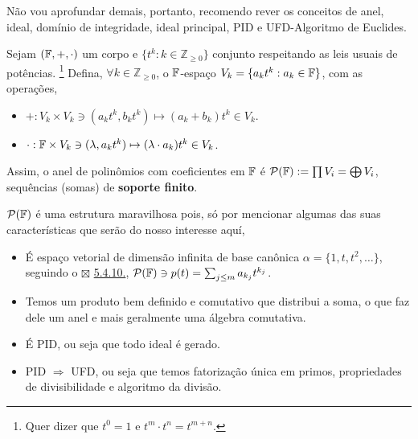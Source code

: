 Não vou aprofundar demais, portanto, recomendo rever os conceitos de anel, ideal, domínio de integridade, ideal principal, PID e UFD-Algoritmo de Euclides. 
\begin{definition}
    Sejam \((\mathbb{F},+,\cdot)\) um corpo e \(\{t^k: k \in \mathbb{Z}_{\geq 0}\}\) conjunto respeitando as leis usuais de potências. \footnote{Quer dizer que \(t^0 =1\) e \(t^m\cdot t^n=t^{m+n}\).  } Defina, \(\forall k \in \mathbb{Z}_{\geq 0}\), o \(\mathbb{F}\)-espaço \(V_k = \{a_kt^k: a_k \in \mathbb{F}\}\), com as operações, 
    \begin{itemize}
        \item \(+: V_k \times V_k \ni (a_kt^k , b_kt^k) \mapsto (a_k+b_k)t^k \in V_k\). 
        \item \(\cdot: \mathbb{F} \times V_k \ni (\lambda, a_kt^k) \mapsto (\lambda\cdot a_k) t^k \in V_k\). 
    \end{itemize} 
    Assim, o anel de polinômios com coeficientes em \(\mathbb{F}\) é \(\mathcal{P}(\mathbb{F}) := \prod V_i = \bigoplus V_i\), sequências (somas) de \textbf{soporte finito}.   
\end{definition}

\newcommand{\Pol}{\mathcal{P}(\F)}
\begin{note}
    \(\Pol\) é uma estrutura maravilhosa pois, só por mencionar algumas das suas características que serão do nosso interesse aquí,  
    \begin{itemize}
        \item É espaço vetorial de dimensão infinita de base canônica \(\alpha = \{1, t, t^2, \ldots\}\), seguindo o {\scriptsize \(\boxtimes\) }\hyperlink{corol5410}{5.4.10.}, \(\Pol \ni p(t) = \sum_{j\leq m}a_{k_j}t^{k_j}\). 
        \item Temos um produto bem definido e comutativo que distribui a soma, o que faz dele um anel e mais geralmente uma álgebra comutativa.  
        \item É PID, ou seja que todo ideal é gerado. 
        \item PID \(\Rightarrow \) UFD, ou seja que temos fatorização única em primos, propriedades de divisibilidade e algoritmo da divisão.
    \end{itemize}
\end{note}

